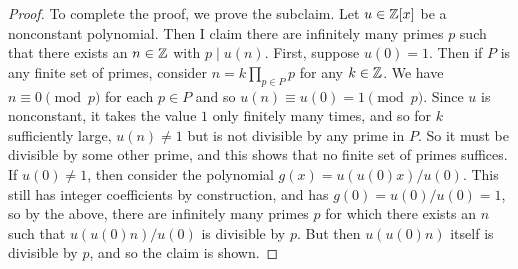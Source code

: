 \begin{proof}
	To complete the proof, we prove the subclaim. Let $u \in \mathbb{Z}[x]$ be a nonconstant polynomial. Then I claim there are infinitely many primes $p$ such that there exists an $n \in \mathbb{Z}$ with $p \mid u(n)$. First, suppose $u(0) = 1$. Then if $P$ is any finite set of primes, consider $n = k\prod_{p \in P} p$ for any $k \in \mathbb{Z}$. We have $n \equiv 0 \pmod{p}$ for each $p \in P$ and so $u(n) \equiv u(0) = 1 \pmod{p}$. Since $u$ is nonconstant, it takes the value $1$ only finitely many times, and so for $k$ sufficiently large, $u(n) \neq 1$ but is not divisible by any prime in $P$. So it must be divisible by some other prime, and this shows that no finite set of primes suffices. If $u(0) \neq 1$, then consider the polynomial $g(x) = u(u(0)x)/u(0)$. This still has integer coefficients by construction, and has $g(0) = u(0)/u(0) = 1$, so by the above, there are infinitely many primes $p$ for which there exists an $n$ such that $u(u(0)n)/u(0)$ is divisible by $p$. But then $u(u(0)n)$ itself is divisible by $p$, and so the claim is shown.
\end{proof}

